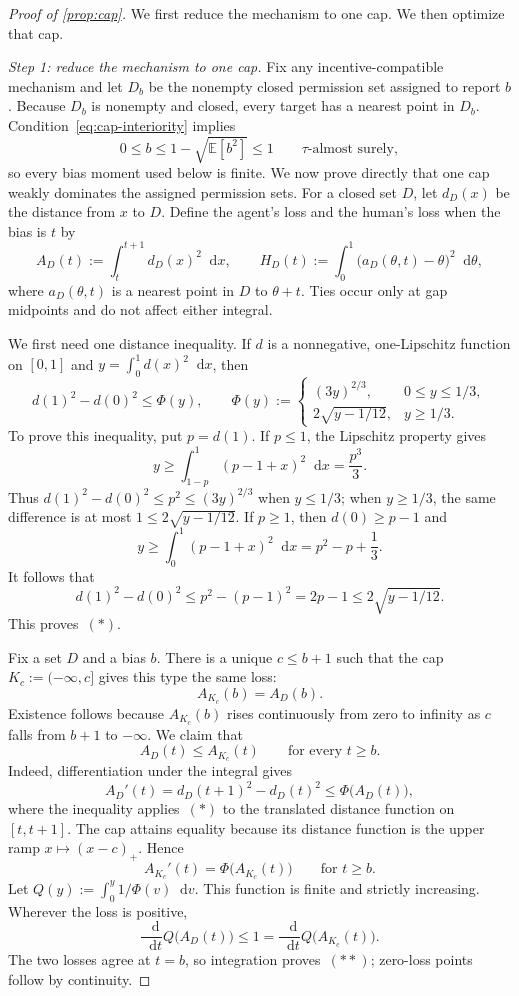 \documentclass[12pt,reqno]{article}
\newcommand{\de}{\mathop{}\!\mathrm{d}}
\newcommand{\Ex}{\mathbb{E}}
\theoremstyle{definition} \newtheorem{example}{Example}
\theoremstyle{definition} \newtheorem{condition}{Condition}
\theoremstyle{definition} \newtheorem{corollary}{Corollary}
\theoremstyle{definition} \newtheorem{claim}{Claim}
\theoremstyle{definition} \newtheorem{definition}{Definition}
\theoremstyle{definition} \newtheorem{conjecture}{Conjecture}
\theoremstyle{definition} \newtheorem{Lemma}{Lemma}
\theoremstyle{definition} \newtheorem{lemma}{Lemma}
\theoremstyle{plain} \newtheorem{theorem}{Theorem}
\theoremstyle{definition} \newtheorem{assumption}{Assumption}
\theoremstyle{definition} \newtheorem*{assumptionnonumber}{Assumption}
\theoremstyle{definition} \newtheorem*{theoremNoNumber}{Proposition}
\theoremstyle{definition}\newtheorem{proposition}{Proposition}
\theoremstyle{definition} \newtheorem{observation}{Observation}
\theoremstyle{definition} \newtheorem*{definitionNoNumber}{Definition}
\theoremstyle{definition} \newtheorem{Definition}{Definition}
\theoremstyle{definition} \newtheorem*{DefinitionNoNumber}{Definition}
\theoremstyle{definition} \newtheorem*{fact}{Fact}
\theoremstyle{definition} \newtheorem*{property}{Property}
\theoremstyle{definition} \newtheorem{remark}{Remark}
\theoremstyle{definition}\newtheorem{romanexampleinner}{Example}
\begin{document}
\begin{proof}[Proof of \cref{prop:cap}]
We first reduce the mechanism to one cap. We then optimize that cap.

\emph{Step 1: reduce the mechanism to one cap.} Fix any incentive-compatible mechanism and let \(D_b\) be the nonempty closed permission set assigned to report \(b\). Because \(D_b\) is nonempty and closed, every target has a nearest point in \(D_b\). Condition~\eqref{eq:cap-interiority} implies
\[
0\leq b\leq1-\sqrt{\Ex[b^2]}\leq1
\qquad \text{$\tau$-almost surely},
\]
so every bias moment used below is finite. We now prove directly that one cap weakly dominates the assigned permission sets.
For a closed set $D$, let $d_D(x)$ be the distance from $x$ to $D$. Define the agent's loss and the human's loss when the bias is $t$ by
\[
A_D(t):=\int_t^{t+1}d_D(x)^2\de x,
\qquad
H_D(t):=\int_0^1\bigl(a_D(\theta,t)-\theta\bigr)^2\de\theta,
\]
where $a_D(\theta,t)$ is a nearest point in $D$ to $\theta+t$. Ties occur only at gap midpoints and do not affect either integral.

We first need one distance inequality. If $d$ is a nonnegative, one-Lipschitz function on $[0,1]$ and $y=\int_0^1d(x)^2\de x$, then
\[
d(1)^2-d(0)^2\leq \Phi(y),
\qquad
\Phi(y):=
\begin{cases}
(3y)^{2/3},&0\leq y\leq 1/3,\\
2\sqrt{y-1/12},&y\geq1/3.
\end{cases} \tag{*}
\]
To prove this inequality, put $p=d(1)$. If $p\leq1$, the Lipschitz property gives
\[
y\geq\int_{1-p}^1(p-1+x)^2\de x=\frac{p^3}{3}.
\]
Thus $d(1)^2-d(0)^2\leq p^2\leq(3y)^{2/3}$ when $y\leq1/3$; when $y\geq1/3$, the same difference is at most $1\leq2\sqrt{y-1/12}$. If $p\geq1$, then $d(0)\geq p-1$ and
\[
y\geq\int_0^1(p-1+x)^2\de x
=p^2-p+\frac13.
\]
It follows that
\[
d(1)^2-d(0)^2
\leq p^2-(p-1)^2
=2p-1
\leq2\sqrt{y-1/12}.
\]
This proves~$(*)$.

Fix a set $D$ and a bias $b$. There is a unique $c\leq b+1$ such that the cap $K_c:=(-\infty,c]$ gives this type the same loss:
\[
A_{K_c}(b)=A_D(b).
\]
Existence follows because $A_{K_c}(b)$ rises continuously from zero to infinity as $c$ falls from $b+1$ to $-\infty$. We claim that
\[
A_D(t)\leq A_{K_c}(t)
\qquad\text{for every }t\geq b. \tag{**}
\]
Indeed, differentiation under the integral gives
\[
A_D'(t)=d_D(t+1)^2-d_D(t)^2\leq\Phi\bigl(A_D(t)\bigr),
\]
where the inequality applies~$(*)$ to the translated distance function on $[t,t+1]$. The cap attains equality because its distance function is the upper ramp $x\mapsto(x-c)_+$. Hence
\[
A_{K_c}'(t)=\Phi\bigl(A_{K_c}(t)\bigr)
\qquad\text{for }t\geq b.
\]
Let $Q(y):=\int_0^y1/\Phi(v)\de v$. This function is finite and strictly increasing. Wherever the loss is positive,
\[
\frac{\de}{\de t}Q\bigl(A_D(t)\bigr)\leq1
=\frac{\de}{\de t}Q\bigl(A_{K_c}(t)\bigr).
\]
The two losses agree at $t=b$, so integration proves~$(**)$; zero-loss points follow by continuity.


\end{proof}
\end{document}
